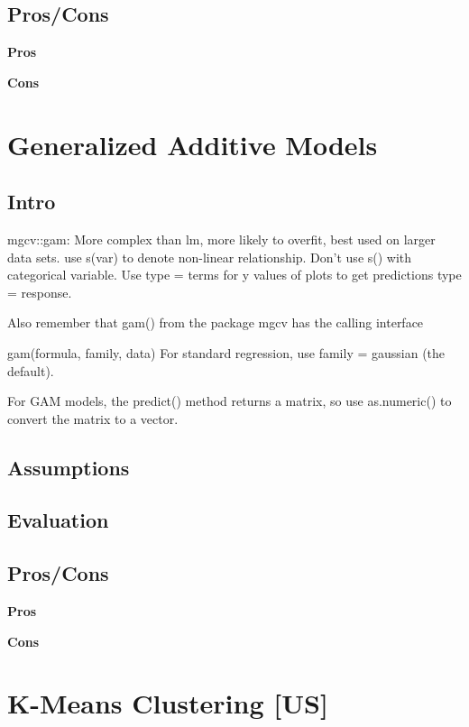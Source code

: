 \documentclass[]{book}
\begin{document}
\subsection{Pros/Cons}\label{proscons-2}

\textbf{Pros}

\textbf{Cons}

\section{Generalized Additive Models}\label{generalized-additive-models}

\subsection{Intro}\label{intro-3}

mgcv::gam: More complex than lm, more likely to overfit, best used on
larger data sets. use s(var) to denote non-linear relationship. Don't
use s() with categorical variable. Use type = terms for y values of
plots to get predictions type = response.

Also remember that gam() from the package mgcv has the calling interface

gam(formula, family, data) For standard regression, use family =
gaussian (the default).

For GAM models, the predict() method returns a matrix, so use
as.numeric() to convert the matrix to a vector.

\subsection{Assumptions}\label{assumptions-2}

\subsection{Evaluation}\label{evaluation-2}

\subsection{Pros/Cons}\label{proscons-3}

\textbf{Pros}

\textbf{Cons}

\section{K-Means Clustering {[}US{]}}\label{k-means-clustering-us}
\end{document}
